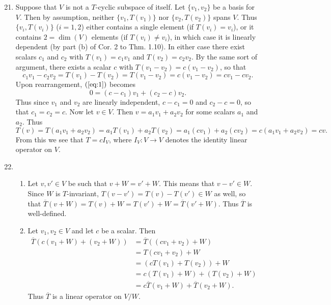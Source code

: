 \documentclass[12pt]{article}
\begin{document}
\begin{enumerate}
\setcounter{enumi}{20}
\item
Suppose that $V$ is not a $T$-cyclic subspace of itself. Let $\{v_1, v_2\}$ be a basis for $V$. Then by assumption, neither $\{v_1, T(v_1)\}$ nor $\{v_2, T(v_2)\}$ spans $V$. Thus $\{v_i, T(v_i)\}$ ($i = 1, 2$) either contains a single element (if $T(v_i) = v_i$), or it contains $2 = \dim(V)$ elements (if $T(v_i) \neq v_i$), in which case it is linearly dependent (by part (b) of Cor. 2 to Thm. 1.10). In either case there exist scalars $c_1$ and $c_2$ with $T(v_1) = c_1 v_1$ and $T(v_2) = c_2 v_2$. By the same sort of argument, there exists a scalar $c$ with $T(v_1 - v_2) = c(v_1 - v_2)$, so that
\begin{equation} \label{eq:1}
c_1 v_1 - c_2 v_2 = T(v_1) - T(v_2) = T(v_1 - v_2) = c(v_1 - v_2) = c v_1 - c v_2.
\end{equation}
Upon rearrangement, $(\ref{eq:1})$ becomes
\begin{equation*}
0 = (c - c_1) v_1 + (c_2 - c) v_2.
\end{equation*}
Thus since $v_1$ and $v_2$ are linearly independent, $c - c_1 = 0$ and $c_2 - c = 0$, so that $c_1 = c_2 = c$. Now let $v \in V$. Then $v = a_1 v_1 + a_2 v_2$ for some scalars $a_1$ and $a_2$. Thus
\begin{equation*}
T(v) = T(a_1 v_1 + a_2 v_2) = a_1 T(v_1) + a_2 T(v_2) = a_1 (c v_1) + a_2 (c v_2) = c(a_1 v_1 + a_2 v_2) = cv.
\end{equation*}
From this we see that $T = cI_V$, where $I_V : V \to V$ denotes the identity linear operator on $V$.

\setcounter{enumi}{26}
\item
\begin{enumerate}
\item
Let $v, v' \in V$ be such that $v + W = v' + W$. This means that $v - v' \in W$. Since $W$ is $T$-invariant, $T(v - v') = T(v) - T(v') \in W$ as well, so that $\overline{T}(v + W) = T(v) + W = T(v') + W = \overline{T}(v' + W)$. Thus $\overline{T}$ is well-defined.

\item
Let $v_1, v_2 \in V$ and let $c$ be a scalar. Then
\begin{align*}
\overline{T}(c(v_1 + W) + (v_2 + W)) &= \overline{T}((c v_1 + v_2) + W) \\
&= T(c v_1 + v_2) + W \\
&= (cT(v_1) + T(v_2)) + W \\
&= c(T(v_1) + W) + (T(v_2) + W) \\
&= c\overline{T}(v_1 + W) + \overline{T}(v_2 + W).
\end{align*}
Thus $\overline{T}$ is a linear operator on $V/W$.


\end{enumerate}
\end{enumerate}
\end{document}
